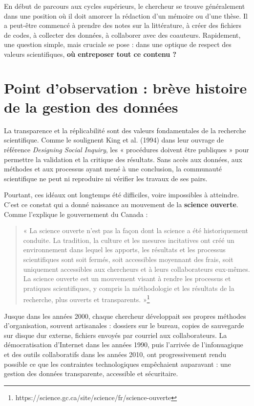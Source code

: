 \documentclass[
  letterpaper,
  DIV=11,
  numbers=noendperiod,
  oneside]{scrreprt}
\begin{document}
En début de parcours aux cycles supérieurs, le chercheur se trouve
généralement dans une position où il doit amorcer la rédaction d'un
mémoire ou d'une thèse. Il a peut-être commencé à prendre des notes sur
la littérature, à créer des fichiers de codes, à collecter des données,
à collaborer avec des coauteurs. Rapidement, une question simple, mais
cruciale se pose : dans une optique de respect des valeurs
scientifiques, \textbf{où entreposer tout ce contenu ?}

\hypertarget{point-dobservation-bruxe8ve-histoire-de-la-gestion-des-donnuxe9es}{%
\section{Point d'observation : brève histoire de la gestion des
données}\label{point-dobservation-bruxe8ve-histoire-de-la-gestion-des-donnuxe9es}}

La transparence et la réplicabilité sont des valeurs fondamentales de la
recherche scientifique. Comme le soulignent King et al. (1994) dans leur
ouvrage de référence \emph{Designing Social Inquiry}, les « procédures
doivent être publiques » pour permettre la validation et la critique des
résultats. Sans accès aux données, aux méthodes et aux processus ayant
mené à une conclusion, la communauté scientifique ne peut ni reproduire
ni vérifier les travaux de ses pairs.

Pourtant, ces idéaux ont longtemps été difficiles, voire impossibles à
atteindre. C'est ce constat qui a donné naissance au mouvement de la
\textbf{science ouverte}. Comme l'explique le gouvernement du Canada :

\begin{quote}
« La science ouverte n'est pas la façon dont la science a été
historiquement conduite. La tradition, la culture et les mesures
incitatives ont créé un environnement dans lequel les apports, les
résultats et les processus scientifiques sont soit fermés, soit
accessibles moyennant des frais, soit uniquement accessibles aux
chercheurs et à leurs collaborateurs eux-mêmes. La science ouverte est
un mouvement visant à rendre les processus et pratiques scientifiques, y
compris la méthodologie et les résultats de la recherche, plus ouverts
et transparents. »\footnote{https://science.gc.ca/site/science/fr/science-ouverte}
\end{quote}

Jusque dans les années 2000, chaque chercheur développait ses propres
méthodes d'organisation, souvent artisanales : dossiers sur le bureau,
copies de sauvegarde sur disque dur externe, fichiers envoyés par
courriel aux collaborateurs. La démocratisation d'Internet dans les
années 1990, puis l'arrivée de l'infonuagique et des outils
collaboratifs dans les années 2010, ont progressivement rendu possible
ce que les contraintes technologiques empêchaient auparavant : une
gestion des données transparente, accessible et sécuritaire.
\end{document}
